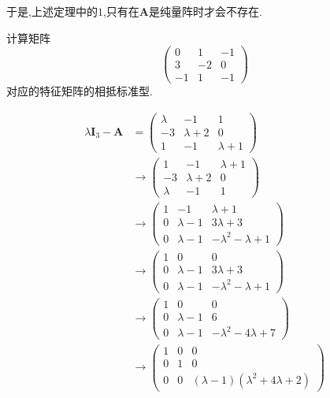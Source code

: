\begin{red}
    \begin{remark}
        于是,上述定理中的$1$,只有在$\bm{A}$是纯量阵时才会不存在.
    \end{remark}
\end{red}
\begin{brown}
\begin{example}
    计算矩阵\newpage
    \[
    \begin{pmatrix}
        0&1&-1\\
        3&-2&0\\
        -1&1&-1
    \end{pmatrix}
    \]对应的特征矩阵的相抵标准型.
\end{example}
\begin{solution}
    \begin{align*}
        \lambda\bm{I}_3-\bm{A}&=\begin{pmatrix}
            \lambda&-1&1\\
            -3&\lambda+2&0\\
            1&-1&\lambda+1
        \end{pmatrix}\\
        &\longrightarrow
\begin{pmatrix}
   1&-1&\lambda+1\\
    -3&\lambda+2&0\\
    \lambda&-1&1
\end{pmatrix}\\
&\longrightarrow
\begin{pmatrix}
    1&-1&\lambda+1\\
    0&\lambda-1&3\lambda+3\\
    0&\lambda-1&-\lambda^2-\lambda+1
\end{pmatrix}\\
&\longrightarrow
\begin{pmatrix}
    1&0&0\\
    0&\lambda-1&3\lambda+3\\
    0&\lambda-1&-\lambda^2-\lambda+1
\end{pmatrix}\\
&\longrightarrow
\begin{pmatrix}
    1&0&0\\
    0&\lambda-1&6\\
    0&\lambda-1&-\lambda^2-4\lambda+7
\end{pmatrix}\\
&\longrightarrow
\begin{pmatrix}
    1&0&0\\
    0&1&0\\
    0&0&\left(\lambda-1\right)\left(\lambda^2+4\lambda+2\right)
\end{pmatrix}
    \end{align*}
\end{solution}
\end{brown}
\newpage
